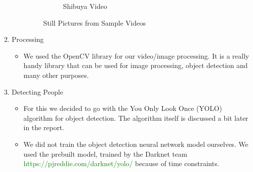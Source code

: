 \documentclass[a4paper]{article}
\begin{document}
\begin{enumerate}
\begin{itemize}[label={}]
\begin{figure}[h!]
\begin{subfigure}[b]{0.4\linewidth}
                            \caption{Shibuya Video}
                        \end{subfigure}
                        \caption{Still Pictures from Sample Videos}
                        \label{fig1:stills}
                    \end{figure}
          \end{itemize}

    \item Processing
    \begin{itemize}[label={}]
        \item We used the OpenCV library for our video/image processing. It is a really handy library that can be used for image processing, object detection and many other purposes.
        
    \end{itemize}
    
    \item Detecting People
          \begin{itemize}
              \item For this we decided to go with the You Only Look Once (YOLO) algorithm for object detection. The algorithm itself is discussed a bit later in the report.
              \item We did not train the object detection neural network model ourselves. We used the prebuilt model, trained by the Darknet team \textcolor{green}{https://pjreddie.com/darknet/yolo/} because of time constraints.
          \end{itemize}


\end{enumerate}
\end{document}
